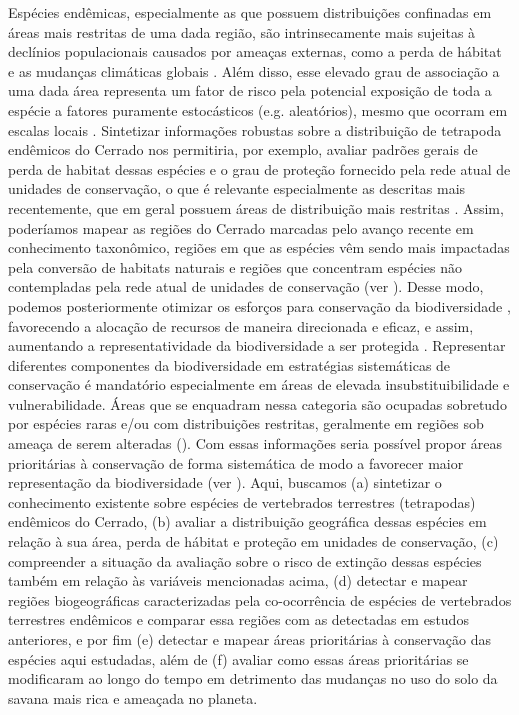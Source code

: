 \documentclass[12pt,openright,oneside,a4paper,english]{abntex2}
\begin{document}
Espécies endêmicas, especialmente as que possuem distribuições confinadas em áreas mais restritas de uma dada região, são intrinsecamente mais sujeitas à declínios populacionais causados por ameaças externas, como a perda de hábitat e as mudanças climáticas globais \citep{Gaston1998}. Além disso, esse elevado grau de associação a uma dada área representa um fator de risco pela potencial exposição de toda a espécie a fatores puramente estocásticos (e.g. aleatórios), mesmo que ocorram em escalas locais \citep{Gaston1998, Gaston2003}. Sintetizar informações robustas sobre a distribuição de tetrapoda endêmicos do Cerrado nos permitiria, por exemplo, avaliar padrões gerais de perda de habitat dessas espécies e o grau de proteção fornecido pela rede atual de unidades de conservação, o que é relevante especialmente as descritas mais recentemente, que em geral possuem áreas de distribuição mais restritas \citep{Gaston1996}. Assim, poderíamos mapear as regiões do Cerrado marcadas pelo avanço recente em conhecimento taxonômico, regiões em que as espécies vêm sendo mais impactadas pela conversão de habitats naturais e regiões que concentram espécies não contempladas pela rede atual de unidades de conservação (ver ). Desse modo, podemos posteriormente otimizar os esforços para conservação da biodiversidade \citep{Whittaker2005}, favorecendo a alocação de recursos de maneira direcionada e eficaz, e assim, aumentando a representatividade da biodiversidade a ser protegida \citep{Brooks2006}. Representar diferentes componentes da biodiversidade em estratégias sistemáticas de conservação é mandatório especialmente em áreas de elevada insubstituibilidade e vulnerabilidade. Áreas que se enquadram nessa categoria são ocupadas sobretudo por espécies raras e/ou com distribuições restritas, geralmente em regiões sob ameaça de serem alteradas (\citealp[e.g. áreas não protegidas legalmente][]{Brooks2006}). Com essas informações seria possível propor áreas prioritárias à conservação de forma sistemática de modo a favorecer maior representação da biodiversidade (ver ). Aqui, buscamos (a) sintetizar o conhecimento existente sobre espécies de vertebrados terrestres (tetrapodas) endêmicos do Cerrado, (b) avaliar a distribuição geográfica dessas espécies em relação à sua área, perda de hábitat e proteção em unidades de conservação, (c) compreender a situação da avaliação sobre o risco de extinção dessas espécies também em relação às variáveis mencionadas acima, (d) detectar e mapear regiões biogeográficas caracterizadas pela co-ocorrência de espécies de vertebrados terrestres endêmicos e comparar essa regiões com as detectadas em estudos anteriores, e por fim (e) detectar e mapear áreas prioritárias à conservação das espécies aqui estudadas, além de (f) avaliar como essas áreas prioritárias se modificaram ao longo do tempo em detrimento das mudanças no uso do solo da savana mais rica e ameaçada no planeta.
\end{document}

